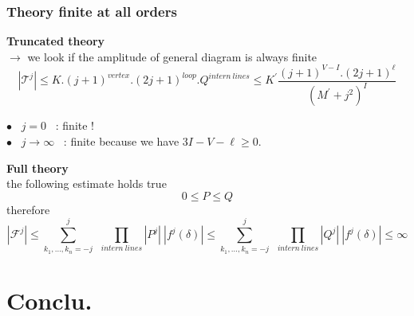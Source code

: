 \documentclass[9pt]{beamer}
\newcommand{\abs}[1]{\left|{#1}\right|} %
\begin{document}
\begin{frame}

\frametitle{Theory finite at all orders}

\vfill

\textbf{Truncated theory} \\
$\to$ we look if the amplitude of general diagram is always finite
%
\begin{equation*}
\abs{\mathcal{T}^j} \leq K . (j+1)^{vertex} . (2j+1)^{loop} . Q^{intern \ lines} \leq K^\prime \frac{(j+1)^{V-I}.(2j+1)^{\ell}}{(M^\prime+j^2)^I}
\end{equation*}

$\bullet$ \ $j=0$ \ : finite ! \\

$\bullet$ \ $j\to\infty$ \ : finite because we have $3I-V-\ell \geq 0$.

\vfill

\textbf{Full theory} \\
the following estimate holds true
\begin{equation*}
0\leq P \leq Q 
\end{equation*}
therefore
\begin{equation*}
\abs{\mathcal{F}^j} \leq \sum_{k_1,\dots,k_n=-j}^{j} \ \ \prod_{intern \ lines} \abs{P^j} \ \abs{f^j(\delta)} \leq \sum_{k_1,\dots,k_n=-j}^{j} \ \ \prod_{intern \ lines} \abs{Q^j} \ \abs{f^j(\delta)} \leq \infty
\end{equation*}

\vfill

\end{frame}

\section{Conclu.}
\end{document}
